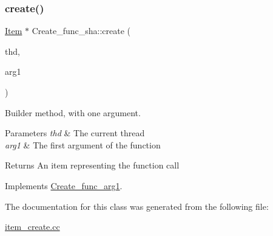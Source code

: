 \subsubsection{\texorpdfstring{create()}{create()}}
{\footnotesize\ttfamily \mbox{\hyperlink{classItem}{Item}} $\ast$ Create\+\_\+func\+\_\+sha\+::create (\begin{DoxyParamCaption}\item[{T\+HD $\ast$}]{thd,  }\item[{\mbox{\hyperlink{classItem}{Item}} $\ast$}]{arg1 }\end{DoxyParamCaption})\hspace{0.3cm}{\ttfamily [virtual]}}

Builder method, with one argument. 
\begin{DoxyParams}{Parameters}
{\em thd} & The current thread \\
\hline
{\em arg1} & The first argument of the function \\
\hline
\end{DoxyParams}
\begin{DoxyReturn}{Returns}
An item representing the function call 
\end{DoxyReturn}


Implements \mbox{\hyperlink{classCreate__func__arg1_a3e9a98f755cd82c3e762e334c955a8c9}{Create\+\_\+func\+\_\+arg1}}.



The documentation for this class was generated from the following file\+:\begin{DoxyCompactItemize}
\item 
\mbox{\hyperlink{item__create_8cc}{item\+\_\+create.\+cc}}\end{DoxyCompactItemize}
